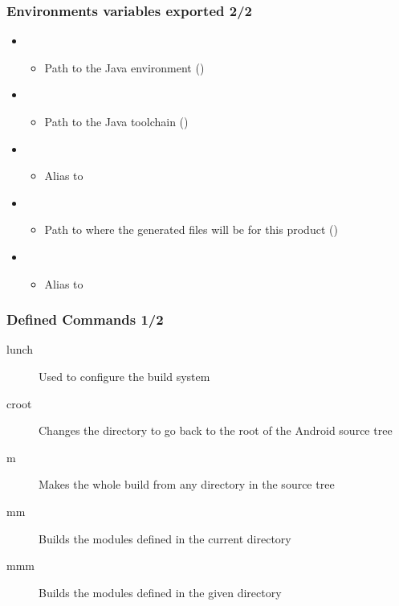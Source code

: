 \begin{frame}
  \frametitle{Environments variables exported 2/2}
  \begin{itemize}
  \item {}
    \begin{itemize}
    \item Path to the Java environment
      ()
    \end{itemize}
  \item {}
    \begin{itemize}
    \item Path to the Java toolchain ()
    \end{itemize}
  \item {}
    \begin{itemize}
    \item Alias to 
    \end{itemize}
  \item {}
    \begin{itemize}
    \item Path to where the generated files will be for this product
      ()
    \end{itemize}
  \item {}
    \begin{itemize}
      \item Alias to 
    \end{itemize}
  \end{itemize}
\end{frame}

\begin{frame}
  \frametitle{Defined Commands 1/2}
  \begin{description}
  \item[lunch] Used to configure the build system
  \item[croot] Changes the directory to go back to the root of the
    Android source tree
  \item[m] Makes the whole build from any directory in the source tree
  \item[mm] Builds the modules defined in the current directory
  \item[mmm] Builds the modules defined in the given directory
  \end{description}
\end{frame}

